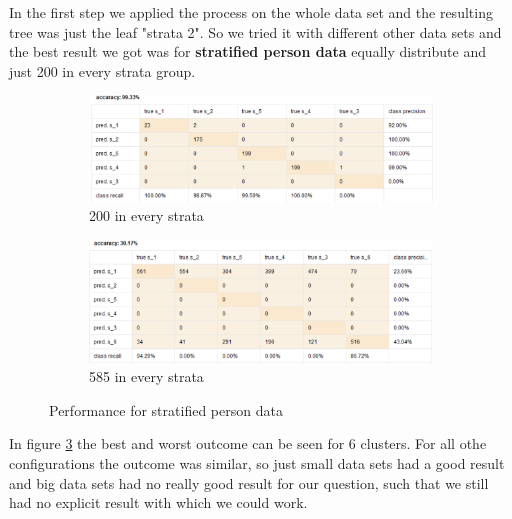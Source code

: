In the first step we applied the process on the whole data set and the resulting tree was just the leaf "strata 2". So we tried it with different other data sets and the best result we got was for \textbf{stratified person data} equally distribute and just 200 in every strata group.

\begin{figure}[!htbp]
\centering
\begin{subfigure}{0.9\textwidth}
\includegraphics[width = \linewidth]{Dec200eqPrec.PNG}
\caption{200 in every strata}
\label{fig:decvec200}
\end{subfigure}
\begin{subfigure}{0.9\textwidth}
\includegraphics[width= \linewidth]{decvec585pre.PNG}
\caption{585 in every strata}
\label{fig:DecVec585}
\end{subfigure}
\caption{Performance for stratified person data}
\label{fig:DecVec}
\end{figure}

In figure \ref{fig:DecVec} the best and worst outcome can be seen for 6 clusters. For all othe configurations the outcome was similar, so just small data sets had a good result and big data sets had no really good result for our question, such that we still had no explicit result with which we could work.